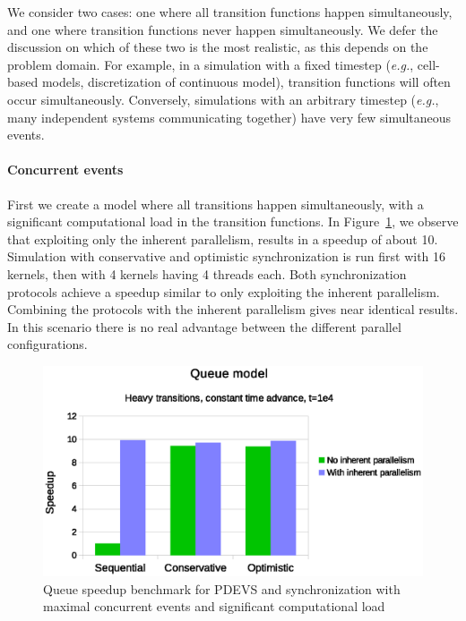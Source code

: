 We consider two cases: one where all transition functions happen simultaneously, and one where transition functions never happen simultaneously.
We defer the discussion on which of these two is the most realistic, as this depends on the problem domain.
For example, in a simulation with a fixed timestep (\textit{e.g.}, cell-based models, discretization of continuous model), transition functions will often occur simultaneously.
Conversely, simulations with an arbitrary timestep (\textit{e.g.}, many independent systems communicating together) have very few simultaneous events.

\paragraph{Concurrent events}
First we create a model where all transitions happen simultaneously, with a significant computational load in the transition functions.
In Figure~\ref{fig:pdevs_plot_fixed_sleep}, we observe that exploiting only the inherent parallelism, results in a speedup of about 10.  
Simulation with conservative and optimistic synchronization is run first with 16 kernels, then with 4 kernels having 4 \pSim threads each. 
Both synchronization protocols achieve a speedup similar to only exploiting the inherent parallelism.
Combining the protocols with the inherent parallelism gives near identical results.
In this scenario there is no real advantage between the different parallel configurations.

\begin{figure}
	\center
	\includegraphics[width=\columnwidth]{fig/pdevs_fixed_sleep.eps}
	\caption{Queue speedup benchmark for PDEVS and synchronization with maximal concurrent events and significant computational load}
	\label{fig:pdevs_plot_fixed_sleep}
\end{figure}

